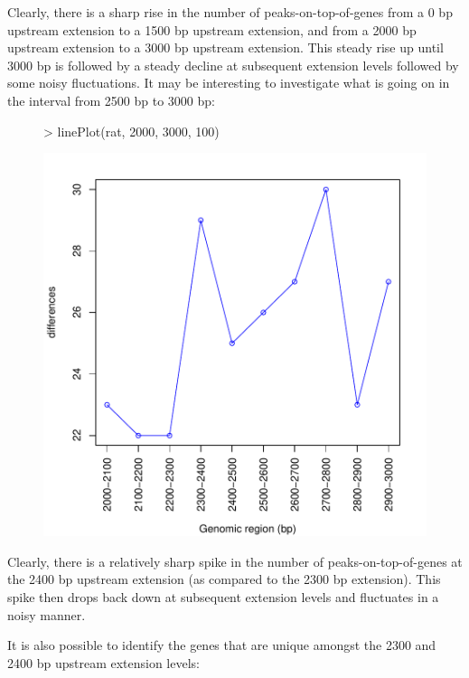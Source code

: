 \documentclass[12pt]{article}
\begin{document}
Clearly, there is a sharp rise in the number of peaks-on-top-of-genes from a 0 bp upstream extension to a 1500 bp upstream extension, and from a 2000 bp upstream extension to a 3000 bp upstream extension.  This steady rise up until 3000 bp is followed by a steady decline at subsequent extension levels followed by some noisy fluctuations.  It may be interesting to investigate what is going on in the interval from 2500 bp to 3000 bp: 

\begin{figure}[H]
\begin{center}
\begin{Schunk}
\begin{Sinput}
> linePlot(rat, 2000, 3000, 100)
\end{Sinput}
\end{Schunk}
\includegraphics{geneXtendeR-008}
\end{center}
\end{figure}

Clearly, there is a relatively sharp spike in the number of peaks-on-top-of-genes at the 2400 bp upstream extension (as compared to the 2300 bp extension).  This spike then drops back down at subsequent extension levels and fluctuates in a noisy manner.  

It is also possible to identify the genes that are unique amongst the 2300 and 2400 bp upstream extension levels:
\end{document}
